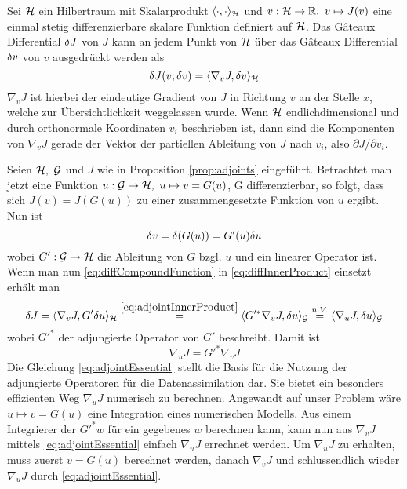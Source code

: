 \begin{proposition}
\label{prop:adjoints}
Sei $\mathcal{H}$ ein Hilbertraum mit Skalarprodukt $\langle \cdot,\cdot \rangle_{\mathcal{H}}$ und $v:\mathcal{H} \to \mathbb{R},~ v\mapsto J(v)$ eine einmal stetig differenzierbare skalare Funktion definiert auf $\mathcal{H}$. Das Gâteaux Differential $\delta J$ von $J$ kann an jedem Punkt von $\mathcal{H}$ über das Gâteaux Differential $\delta v$ von $v$ ausgedrückt werden als
 \begin{equation}
 \label{eq:diffInnerProduct}
  \delta J(v;\delta v) = \langle \nabla_v J, \delta v\rangle_{\mathcal{H}}
 \end{equation}
 $\nabla_v J$ ist hierbei der eindeutige Gradient von $J$ in Richtung $v$ an der Stelle $x$, welche zur Übersichtlichkeit weggelassen wurde. Wenn $\mathcal{H}$ endlichdimensional und durch orthonormale Koordinaten $v_i$ beschrieben ist, dann sind die Komponenten von $\nabla_v J$ gerade der Vektor der partiellen Ableitung von $J$ nach $v_i$, also $\partial J/\partial v_i$.
\end{proposition}


Seien $\mathcal{H},~\mathcal{G}$ und $J$ wie in Proposition \ref{prop:adjoints} eingeführt. Betrachtet man jetzt eine Funktion $u:\mathcal{G} \to \mathcal{H}, ~u\mapsto v = G(u)$, G differenzierbar, so folgt, dass sich $J(v) = J(G(u))$ zu einer zusammengesetzte Funktion von $u$ ergibt. Nun ist 
\begin{equation}
\label{eq:diffCompoundFunction}
\delta v = \delta(G(u)) = G'(u)\delta u
\end{equation}
wobei $G':\mathcal{G}\to\mathcal{H}$ die Ableitung von $G$ bzgl. $u$ und ein linearer Operator ist. Wenn man nun \eqref{eq:diffCompoundFunction} in \eqref{eq:diffInnerProduct} einsetzt erhält man 
\begin{equation}
 \delta J = \langle \nabla_v J,G'\delta u\rangle_{\mathcal{H}} \overset{\eqref{eq:adjointInnerProduct}}{=}  \langle G'^* \nabla_v J,\delta u\rangle_{\mathcal{G}} \overset{n.V.}{=} \langle \nabla_u J,\delta u\rangle_{\mathcal{G}} 
\end{equation}
wobei $G'^*$ der adjungierte Operator von $G'$ beschreibt. Damit ist 
\begin{equation}
\label{eq:adjointEssential}
\nabla_u J = G'^*\nabla_v J
\end{equation} 
Die Gleichung \eqref{eq:adjointEssential} stellt die Basis für die Nutzung der adjungierte Operatoren für die Datenassimilation dar. Sie bietet ein besonders effizienten Weg $\nabla_u J$ numerisch zu berechnen. Angewandt auf unser Problem wäre $u\mapsto v =G(u) $ eine Integration eines numerischen Modells. Aus einem Integrierer der $G'^*w$ für ein gegebenes $w$ berechnen kann, kann nun aus $\nabla_v J$ mittels \eqref{eq:adjointEssential} einfach $\nabla_u J$ errechnet werden. 
Um $\nabla_u J$ zu erhalten, muss zuerst $v = G(u)$ berechnet werden, danach $\nabla_v J$ und schlussendlich wieder $\nabla_u J$ durch \eqref{eq:adjointEssential}.

